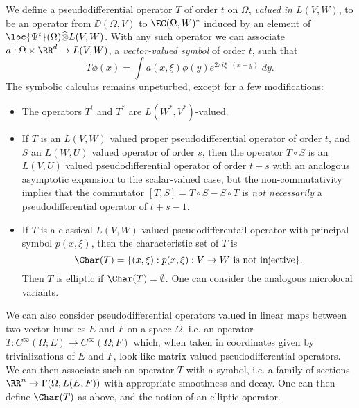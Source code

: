 We define a pseudodifferential operator $T$ of order $t$ on $\Omega$, \emph{valued in $L(V,W)$}, to be an operator from $\DD(\Omega,V)$ to $\EC(\Omega,W)^*$ induced by an element of $\loc{\Psi^t}(\Omega) \widehat{\otimes} L(V,W)$. With any such operator we can associate $a: \Omega \times \RR^d \to L(V,W)$, a \emph{vector-valued symbol} of order $t$, such that
%
\[ T\phi(x) = \int a(x,\xi) \phi(y) e^{2 \pi i \xi \cdot (x-y)}\; dy. \]
%
The symbolic calculus remains unpeturbed, except for a few modifications:
%
\begin{itemize}
    \item The operators $T^t$ and $T^*$ are $L(W^*,V^*)$-valued.

    \item If $T$ is an $L(V,W)$ valued proper pseudodifferential operator of order $t$, and $S$ an $L(W,U)$ valued operator of order $s$, then the operator $T \circ S$ is an $L(V,U)$ valued pseudodifferential operator of order $t + s$ with an analogous asymptotic expansion to the scalar-valued case, but the non-commutativity implies that the commutator $[T,S] = T \circ S - S \circ T$ is \emph{not necessarily} a pseudodifferential operator of $t + s - 1$.

    \item If $T$ is a classical $L(V,W)$ valued pseudodifferentail operator with principal symbol $p(x,\xi)$, then the characteristic set of $T$ is
    \[ \Char(T) = \{ (x,\xi): p(x,\xi): V \to W\ \text{is not injective} \}. \]
    Then $T$ is elliptic if $\Char(T) = \emptyset$. One can consider the analogous microlocal variants.
\end{itemize}

We can also consider pseudodifferential operators valued in linear maps between two vector bundles $E$ and $F$ on a space $\Omega$, i.e. an operator $T: C^\infty(\Omega;E) \to C^\infty(\Omega;F)$ which, when taken in coordinates given by trivializations of $E$ and $F$, look like matrix valued pseudodifferential operators. We can then associate such an operator $T$ with a symbol, i.e. a family of sections $\RR^n \to \Gamma(\Omega, L(E,F))$ with appropriate smoothness and decay. One can then define $\Char(T)$ as above, and the notion of an elliptic operator.

